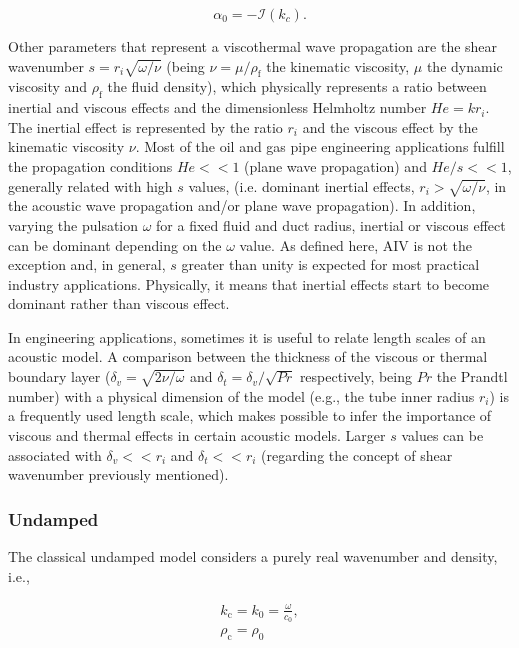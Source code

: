 \documentclass[12pt]{article}
\begin{document}
\begin{equation} \label{eq:alpha0}
	\alpha_0 = - \mathcal{I}(k_c).
\end{equation}

Other parameters that represent a viscothermal wave propagation are the shear wavenumber $s=r_i \sqrt{\omega / \nu}$ (being $\nu=\mu/\rho_{\text{f}}$ the kinematic viscosity, $\mu$ the dynamic viscosity and $\rho_{\text{f}}$ the fluid density), which physically represents a ratio between inertial and viscous effects and the dimensionless Helmholtz number $He = k r_i$. The inertial effect is represented by the ratio $r_i$ and the viscous effect by the kinematic viscosity $\nu$. Most of the oil and gas pipe engineering applications fulfill the propagation conditions $He<<1$ (plane wave propagation) and $He/s << 1$, generally related with high $s$ values, (i.e. dominant inertial effects, $r_i > \sqrt{\omega / \nu}$, in the acoustic wave propagation and/or plane wave propagation). In addition, varying the pulsation $\omega$ for a fixed fluid and duct radius, inertial or viscous effect can be dominant depending on the $\omega$ value. As defined here, \acrshort{AIV} is not the exception and, in general, $s$ greater than unity is expected for most practical industry applications. Physically, it means that inertial effects start to become dominant rather than viscous effect. 

In engineering applications, sometimes it is useful to relate length scales of an acoustic model. A comparison between the thickness of the viscous or thermal boundary layer ($\delta_v = \sqrt{2 \nu / \omega}$ and $\delta_t = \delta_v / \sqrt{Pr}$ respectively, being $Pr$ the Prandtl number) with a physical dimension of the model (e.g., the tube inner radius $r_i$) is a frequently used length scale, which makes possible to infer the importance of viscous and thermal effects in certain acoustic models. Larger $s$ values can be associated with $\delta_v << r_i$ and $\delta_t << r_i$ (regarding the concept of shear wavenumber previously mentioned).

\subsubsection{Undamped} \label{subsubsec:undamped}

The classical undamped model considers a purely real wavenumber and density, i.e.,

\begin{gather} 
	k_{\text{c}} = k_0 = \frac{\omega}{c_0},  \\
	\rho_{\text{c}} = \rho_0	
\end{gather}
\end{document}
